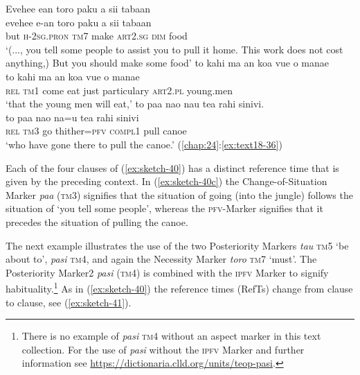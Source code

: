 \documentclass[output=paper]{langscibook}
\begin{document}
\newpage
\ea\label{ex:sketch-40}
    \ea\label{ex:sketch-40a}
        Evehee ean toro paku a sii tabaan\\
        \gll evehee e-an toro paku a sii tabaan\\
        but	\textsc{h}-2\textsc{sg}.\textsc{pron} \textsc{tm}7 make \textsc{art}2.\textsc{sg} \textsc{dim} food\\
        \glt `(..., you tell some people to assist you to pull it home. This work does not cost anything,) But you should make some food'
    \ex\label{ex:sketch-40b}
        to kahi ma an koa vue o manae\\
        \gll to kahi ma an koa vue o manae\\
        \textsc{rel} \textsc{tm}1 come eat just particulary \textsc{art}2.\textsc{pl} young.men\\
        \glt `that the young men will eat,'
    \ex\label{ex:sketch-40c}
        to paa nao nau tea rahi sinivi.\\
        \gll to paa nao na=u tea rahi sinivi\\
        \textsc{rel} \textsc{tm}3 go thither=\textsc{pfv} \textsc{compl}1 pull canoe\\
        \glt `who have gone there to pull the canoe.' (\ref{chap:24}:\ref{ex:text18-36})
    \z
\z

Each of the four clauses of (\ref{ex:sketch-40}) has a distinct reference time that is given by the preceding context. In (\ref{ex:sketch-40c}) the Change-of-Situation Marker \textit{paa} (\textsc{tm}3) signifies that the situation of going (into the jungle) follows the situation of `you tell some people', whereas the \textsc{pfv}-Marker signifies that it precedes the situation of pulling the canoe.

The next example illustrates the use of the two Posteriority Markers \textit{tau} \textsc{tm}5 `be about to', \textit{pasi} \textsc{tm}4, and again the Necessity Marker \textit{toro} \textsc{tm}7 `must'. The Posteriority Marker2 \textit{pasi} (\textsc{tm}4) is combined with the \textsc{ipfv} Marker to signify habituality.\footnote{There is no example of \textit{pasi} \textsc{tm}4 without an aspect marker in this text collection. For the use of \textit{pasi} without the \textsc{ipfv} Marker and further information see \url{https://dictionaria.clld.org/units/teop-pasi}.} As in (\ref{ex:sketch-40}) the reference times (RefTs) change from clause to clause, see (\ref{ex:sketch-41}).
\end{document}
